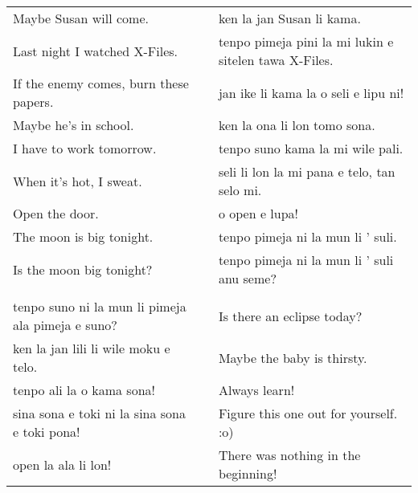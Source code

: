 \begin{supertabular}{p{5,5cm}|ll}
Maybe Susan will come.  && ken la jan Susan li kama. \\ %
Last night I watched X-Files.  && tenpo pimeja pini la mi lukin e sitelen tawa X-Files. \\ %
If the enemy comes, burn these papers.  && jan ike li kama la o seli e lipu ni! \\ %
Maybe he's in school.  && ken la ona li lon tomo sona. \\ %
I have to work tomorrow.  && tenpo suno kama la mi wile pali. \\ %
When it's hot, I sweat.  && seli li lon la mi pana e telo, tan selo mi. \\ %
Open the door.  && o open e lupa! \\ %
The moon is big tonight.  && tenpo pimeja ni la mun li ' suli. \\ %
Is the moon big tonight?  && tenpo pimeja ni la mun li ' suli anu seme? \\ %
 && \\ %
tenpo suno ni la mun li pimeja ala pimeja e suno? && Is there an eclipse today? \\
ken la jan lili li wile moku e telo.  && Maybe the baby is thirsty. \\
tenpo ali la o kama sona!  && Always learn!  \\
sina sona e toki ni la sina sona e toki pona!  && Figure this one out for yourself. :o) \\
open la ala li lon! && There was nothing in the beginning! \\
\end{supertabular}  
